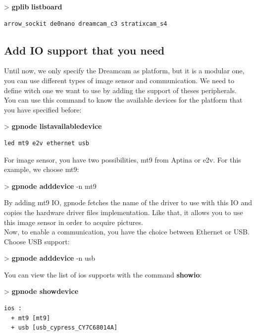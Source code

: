 \documentclass[10pt,a4paper]{article}
\begin{document}
\begin{sample}
> \textbf{gplib} \textbf{listboard}
\begin{Verbatim}
arrow_sockit de0nano dreamcam_c3 stratixcam_s4
\end{Verbatim}
\end{sample}

\subsection{Add IO support that you need}
Until now, we only specify the Dreamcam as platform, but it is a modular one, you can use different types of image sensor and communication. We need to define witch one we want to use by adding the support of theses peripherals. \\

You can use this command to know the available devices for the platform that you have specified before:
\begin{sample}
> \textbf{gpnode listavailabledevice}
\begin{Verbatim}
led mt9 e2v ethernet usb
\end{Verbatim}
\end{sample}

For image sensor, you have two possibilities, mt9 from Aptina or e2v. For this example, we choose mt9:

\begin{sample}
> \textbf{gpnode adddevice} -n mt9
\end{sample}

By adding mt9 IO, gpnode fetches the name of the driver to use with this IO and copies the hardware driver files implementation. Like that, it allows you to use this image sensor in order to acquire pictures.\\

Now, to enable a communication, you have the choice between Ethernet or USB. Choose USB support:

\begin{sample}
> \textbf{gpnode adddevice} -n usb
\end{sample}

You can view the list of ios supports with the command \textbf{showio}:

\begin{sample}
> \textbf{gpnode showdevice}
\begin{Verbatim}
ios :
  + mt9 [mt9]
  + usb [usb_cypress_CY7C68014A]
\end{Verbatim}
\end{sample}
\end{document}
